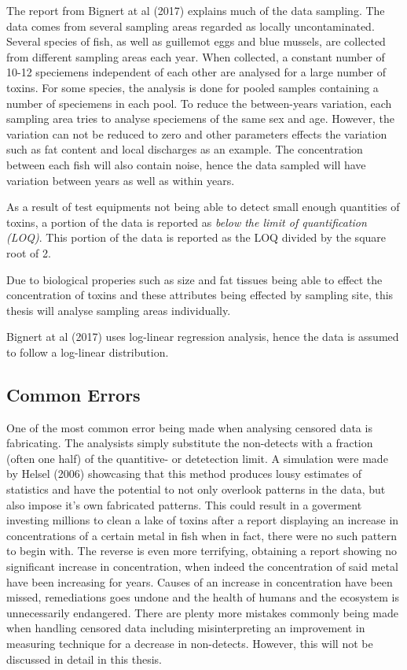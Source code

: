 \documentclass[]{article}
\begin{document}
The report from Bignert at al (2017) explains much of the data sampling.
The data comes from several sampling areas regarded as locally
uncontaminated. Several species of fish, as well as guillemot eggs and
blue mussels, are collected from different sampling areas each year.
When collected, a constant number of 10-12 speciemens independent of
each other are analysed for a large number of toxins. For some species,
the analysis is done for pooled samples containing a number of
speciemens in each pool. To reduce the between-years variation, each
sampling area tries to analyse speciemens of the same sex and age.
However, the variation can not be reduced to zero and other parameters
effects the variation such as fat content and local discharges as an
example. The concentration between each fish will also contain noise,
hence the data sampled will have variation between years as well as
within years.

As a result of test equipments not being able to detect small enough
quantities of toxins, a portion of the data is reported as \emph{below
the limit of quantification (LOQ)}. This portion of the data is reported
as the LOQ divided by the square root of 2.

Due to biological properies such as size and fat tissues being able to
effect the concentration of toxins and these attributes being effected
by sampling site, this thesis will analyse sampling areas individually.

Bignert at al (2017) uses log-linear regression analysis, hence the data
is assumed to follow a log-linear distribution.

\subsection{Common Errors}\label{common-errors}

One of the most common error being made when analysing censored data is
fabricating. The analysists simply substitute the non-detects with a
fraction (often one half) of the quantitive- or detetection limit. A
simulation were made by Helsel (2006) showcasing that this method
produces lousy estimates of statistics and have the potential to not
only overlook patterns in the data, but also impose it's own fabricated
patterns. This could result in a goverment investing millions to clean a
lake of toxins after a report displaying an increase in concentrations
of a certain metal in fish when in fact, there were no such pattern to
begin with. The reverse is even more terrifying, obtaining a report
showing no significant increase in concentration, when indeed the
concentration of said metal have been increasing for years. Causes of an
increase in concentration have been missed, remediations goes undone and
the health of humans and the ecosystem is unnecessarily endangered.
There are plenty more mistakes commonly being made when handling
censored data including misinterpreting an improvement in measuring
technique for a decrease in non-detects. However, this will not be
discussed in detail in this thesis.
\end{document}
